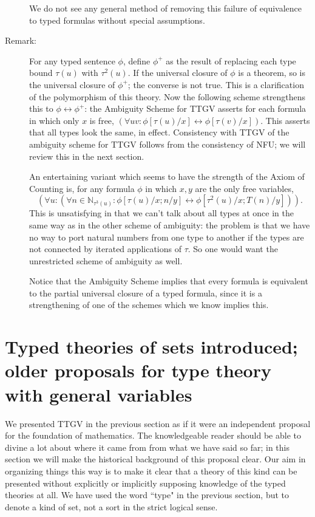 \documentclass[12pt]{article}
\begin{document}
\begin{description}
We do not see any general method of removing this failure of equivalence to typed formulas without special assumptions.

\item[Remark:]  For any typed sentence $\phi$, define $\phi^+$ as the result of replacing each type bound $\tau(u)$ with $\tau^2(u)$.  If the universal closure of $\phi$ is a theorem,
so is the universal closure of $\phi^+$;  the converse is not true.  This is a clarification of the polymorphism of this theory.  Now the following scheme strengthens this to $\phi \leftrightarrow \phi^+$:  the Ambiguity Scheme for TTGV asserts for each formula in which only $x$ is free, $(\forall uv:\phi[\tau(u)/x] \leftrightarrow \phi[\tau(v)/x])$.  This asserts
that all types look the same, in effect.  Consistency with TTGV of the ambiguity scheme for TTGV follows from the consistency of NFU;  we will review this in the next section.

An entertaining variant which seems to have the strength of the Axiom of Counting is, for any formula $\phi$ in which $x,y$ are the only free variables,
$$(\forall u:(\forall n \in {\mathbb N}_{\tau^3(u)}:\phi[\tau(u)/x;n/y] \leftrightarrow \phi[\tau^2(u)/x;T(n)/y])).$$  This is unsatisfying in that we can't talk about all types at once in the same way as in the other scheme of ambiguity:  the problem is that we have no way to port natural numbers from one type to another if the types  are not connected by iterated applications of $\tau$.  So one would want the unrestricted scheme of ambiguity as well.

Notice that the Ambiguity Scheme implies that every formula is equivalent to the partial universal closure of a typed formula, since it is a strengthening of one of the schemes which we know implies this.

\end{description}


\section{Typed theories of sets introduced;  older proposals for type theory with general variables}

We presented TTGV in the previous section as if it were an independent proposal for the foundation of mathematics.  The knowledgeable reader should be able to divine a lot about where it came from from what we have said so far;  in this section we will make the historical background of this proposal clear.  Our aim in organizing things this way is to make it clear that a theory of this kind can be presented without explicitly or implicitly supposing knowledge of the typed theories at all.  We have used the word ``type" in the previous section, but to denote a kind of set, not a sort in the strict logical sense.
\end{document}
